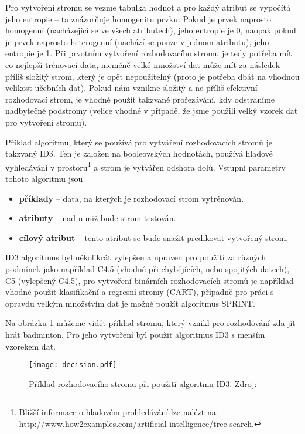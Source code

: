 \par Pro vytvoření stromu se vezme tabulka hodnot a pro každý atribut se vypočítá jeho entropie -- ta znázorňuje homogenitu prvku. Pokud je prvek naprosto homogenní (nacházející se ve všech atributech), jeho entropie je 0, naopak pokud je prvek naprosto heterogenní (nachází se pouze v jednom atributu), jeho entropie je 1. Při prvotním vytvoření rozhodovacího stromu je tedy potřeba mít co nejlepší trénovací data, nicméně velké množství dat může mít za následek příliš složitý strom, který je opět nepoužitelný (proto je potřeba dbát na vhodnou velikost učebních dat). Pokud nám vznikne složitý a ne příliš efektivní rozhodovací strom, je vhodné použít takzvané prořezávání, kdy odstraníme nadbytečné podstromy (velice vhodné v případě, že jsme použili velký vzorek dat pro vytvoření stromu). \cite{data-mining-principles}

\par Příklad algoritmu, který se používá pro vytváření rozhodovacích stromů je takzvaný ID3. Ten je založen na booleovských hodnotách, používá hladové vyhledávání v prostoru\footnote{Bližší informace o hladovém prohledávání lze nalézt na: \url{http://www.how2examples.com/artificial-intelligence/tree-search}.} a strom je vytvářen odshora dolů. Vstupní parametry tohoto algoritmu jsou
\begin{itemize}
\item \textbf{příklady} -- data, na kterých je rozhodovací strom vytrénován.
\item \textbf{atributy} -- nad nimiž bude strom testován.
\item  \textbf{cílový atribut} -- tento atribut se bude snažit predikovat vytvořený strom. \cite{minigbook}
\end{itemize}
ID3 algoritmus byl několikrát vylepšen a upraven pro použití za různých podmínek jako například C4.5 (vhodné při chybějících, nebo spojitých datech), C5 (vylepšený C4.5), pro vytvoření binárních rozhodovacích stromů je například vhodné použít klasifikační a regresní stromy (CART), případně pro práci s opravdu velkým množstvím dat je možné použít algoritmus SPRINT. \cite{minigbook}

\par Na obrázku \ref{decision-tree} můžeme vidět příklad stromu, který vznikl pro rozhodování zda jít hrát badminton. Pro jeho vytvoření byl použit algoritmus ID3 s menším vzorekem dat.
\begin{figure}[htp]
\centering
\texttt{[image: decision.pdf]}
\caption[Příklad rozhodovacího stromu při použití algoritmu ID3]{Příklad rozhodovacího stromu při použití algoritmu ID3. Zdroj: \cite{minigbook}}
\label{decision-tree}
\end{figure}

